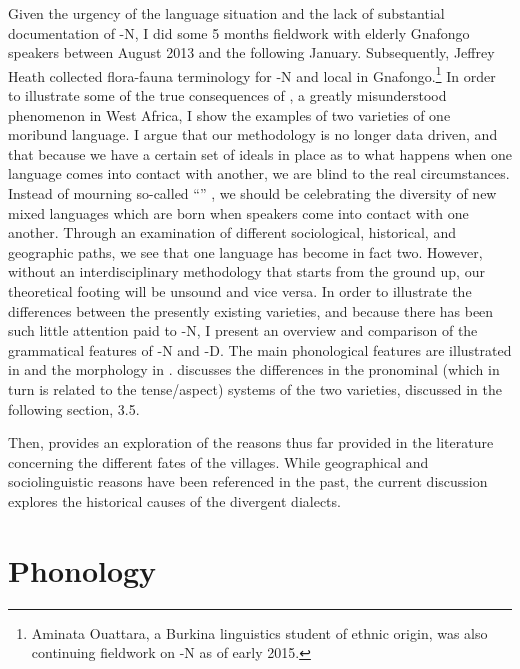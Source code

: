 \documentclass[output=paper,
modfonts
]{langscibook}
\begin{document}
\largerpage
Given the urgency of the language situation and the lack of substantial documentation of -N, I did some 5 months fieldwork with elderly Gnafongo speakers between August 2013 and the following January. Subsequently, Jeffrey Heath collected flora-fauna terminology for -N and local  in Gnafongo.\footnote{Aminata Ouattara, a Burkina linguistics student of ethnic  origin, was also continuing fieldwork on -N as of early 2015.} In order to illustrate some of the true consequences of , a greatly misunderstood phenomenon in West Africa, I show the examples of two varieties of one moribund language. I argue that our methodology is no longer data driven, and that because we have a certain set of ideals in place as to what happens when one language comes into contact with another, we are blind to the real circumstances.  Instead of mourning so-called ``'' \citep{NettleRomaine2000,Price1984}, we should be celebrating the diversity of new mixed languages which are born when speakers come into contact with one another. Through an examination of different sociological, historical, and geographic paths, we see that one language has become in fact two. However, without an interdisciplinary methodology that starts from the ground up, our theoretical footing will be unsound and vice versa. In order to illustrate the differences between the presently existing  varieties, and because there has been such little attention paid to -N, I present an overview and comparison of the  grammatical features of -N and -D. The main phonological features are illustrated in  and the morphology in .  discusses the differences in the pronominal (which in turn is related to the tense/aspect) systems of the two varieties, discussed in the following section, 3.5.

Then,  provides an exploration of the reasons thus far provided in the literature concerning the different fates of the  villages. While geographical and sociolinguistic reasons have been referenced in the past, the current discussion explores the historical causes of the divergent dialects.

\section{Phonology}\label{sec:hangtan:2}
\end{document}
